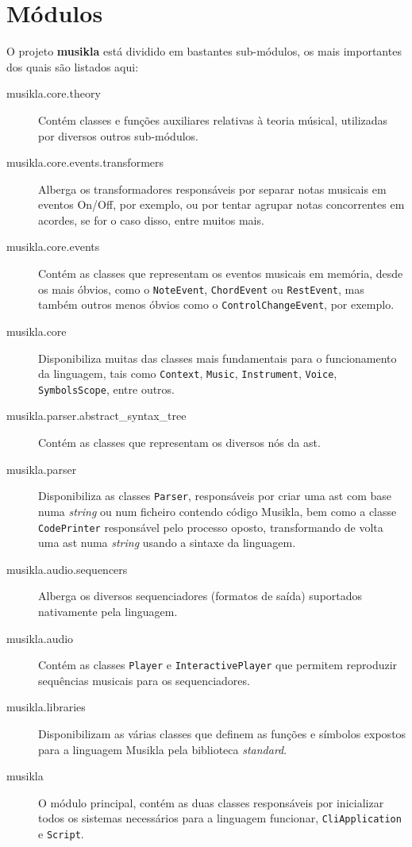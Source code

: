 \section{Módulos}
O projeto \textbf{musikla} está dividido em bastantes sub-módulos, os mais importantes dos quais são listados aqui:

\begin{description}
 \item[musikla.core.theory] Contém classes e funções auxiliares relativas à teoria músical, utilizadas por diversos outros sub-módulos.
 \item[musikla.core.events.transformers] Alberga os transformadores responsáveis por separar notas musicais em eventos On/Off, por exemplo, ou por tentar agrupar notas concorrentes em acordes, se for o caso disso, entre muitos mais.
 \item[musikla.core.events] Contém as classes que representam os eventos musicais em memória, desde os mais óbvios, como o \texttt{NoteEvent}, \texttt{ChordEvent} ou \texttt{RestEvent}, mas também outros menos óbvios como o \texttt{ControlChangeEvent}, por exemplo.
 \item[musikla.core] Disponibiliza muitas das classes mais fundamentais para o funcionamento da linguagem, tais como \texttt{Context}, \texttt{Music}, \texttt{Instrument}, \texttt{Voice}, \texttt{SymbolsScope}, entre outros.
 \item[musikla.parser.abstract\_syntax\_tree] Contém as classes que representam os diversos nós da \acrshort{ast}.
 \item[musikla.parser] Disponibiliza as classes \texttt{Parser}, responsáveis por criar uma \acrshort{ast} com base numa \textit{string} ou num ficheiro contendo código Musikla, bem como a classe \texttt{CodePrinter} responsável pelo processo oposto, transformando de volta uma \acrshort{ast} numa \textit{string} usando a sintaxe da linguagem.
 \item[musikla.audio.sequencers] Alberga os diversos sequenciadores (formatos de saída) suportados nativamente pela linguagem.
 \item[musikla.audio] Contém as classes \texttt{Player} e \texttt{InteractivePlayer} que permitem reproduzir sequências musicais para os sequenciadores.
 \item[musikla.libraries] Disponibilizam as várias classes que definem as funções e símbolos expostos para a linguagem Musikla pela biblioteca \textit{standard}.
 \item[musikla] O módulo  principal, contém as duas classes responsáveis por inicializar todos os sistemas necessários para a linguagem funcionar, \texttt{CliApplication} e \texttt{Script}.
\end{description}

